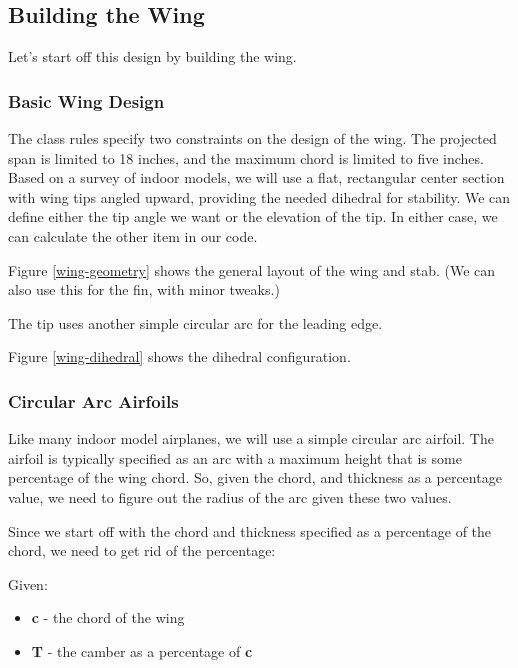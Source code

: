 \subsection{Building the Wing}

Let's start off this design by building the wing.

\subsubsection*{Basic Wing Design}

The class rules specify two constraints on the design of the wing. The projected
span is limited to 18 inches, and the maximum chord is limited to five inches.
Based on a survey of indoor models, we will use a flat, rectangular center section with wing
tips angled upward, providing the needed dihedral for stability. We can define
either the tip angle we want or the elevation of the tip. In either case, we can
calculate the other item in our code.


Figure \ref{wing-geometry} shows the general layout of the wing and stab. (We
can also use this for the fin, with minor tweaks.)


The tip uses another simple circular arc for the leading edge.

Figure \ref{wing-dihedral} shows the dihedral configuration.


\subsubsection{Circular Arc Airfoils}

Like many indoor model airplanes, we will use a simple circular arc airfoil.
The airfoil is typically specified as an arc with a maximum height that is some
percentage of the wing chord.  So, given the chord, and thickness as a
percentage value, we need to figure out the radius of the arc given these two
values.

Since we start off with the chord and thickness specified as a percentage of the chord, we
need to get rid of the percentage:

Given:

\begin{itemize}
  \item{{\bf c} - the chord of the wing}
  \item{{\bf T} - the camber as a percentage of {\bf c}}
\end{itemize}

